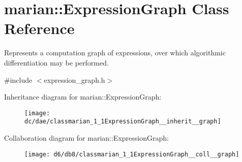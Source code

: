 \hypertarget{classmarian_1_1ExpressionGraph}{}\section{marian\+:\+:Expression\+Graph Class Reference}
\label{classmarian_1_1ExpressionGraph}


Represents a computation graph of expressions, over which algorithmic differentiation may be performed.  




{\ttfamily \#include $<$expression\+\_\+graph.\+h$>$}



Inheritance diagram for marian\+:\+:Expression\+Graph\+:
\nopagebreak
\begin{figure}[H]
\begin{center}
\leavevmode
\texttt{[image: dc/dae/classmarian\_1\_1ExpressionGraph\_\_inherit\_\_graph]}
\end{center}
\end{figure}


Collaboration diagram for marian\+:\+:Expression\+Graph\+:
\nopagebreak
\begin{figure}[H]
\begin{center}
\leavevmode
\texttt{[image: d6/db8/classmarian\_1\_1ExpressionGraph\_\_coll\_\_graph]}
\end{center}
\end{figure}
